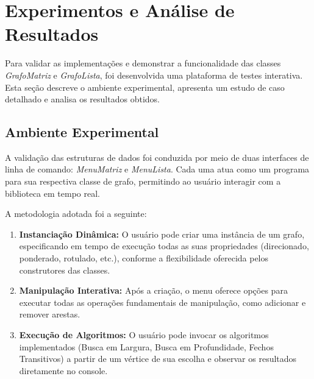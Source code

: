 \documentclass{sbc2023}%
\begin{document}


\section{Experimentos e Análise de Resultados}
\label{experimentos}

    Para validar as implementações e demonstrar a funcionalidade das classes \textit{GrafoMatriz} e \textit{GrafoLista}, foi desenvolvida uma plataforma de testes interativa. Esta seção descreve o ambiente experimental, apresenta um estudo de caso detalhado e analisa os resultados obtidos.
    
    \subsection{Ambiente Experimental}
    
        A validação das estruturas de dados foi conduzida por meio de duas interfaces de linha de comando: \textit{MenuMatriz} e \textit{MenuLista}. Cada uma atua como um programa para sua respectiva classe de grafo, permitindo ao usuário interagir com a biblioteca em tempo real.
        
        A metodologia adotada foi a seguinte:
        
        \begin{enumerate}
            \item \textbf{Instanciação Dinâmica:} O usuário pode criar uma instância de um grafo, especificando em tempo de execução todas as suas propriedades (direcionado, ponderado, rotulado, etc.), conforme a flexibilidade oferecida pelos construtores das classes.
            \item \textbf{Manipulação Interativa:} Após a criação, o menu oferece opções para executar todas as operações fundamentais de manipulação, como adicionar e remover arestas.
            \item \textbf{Execução de Algoritmos:} O usuário pode invocar os algoritmos implementados (Busca em Largura, Busca em Profundidade, Fechos Transitivos) a partir de um vértice de sua escolha e observar os resultados diretamente no console.
        \end{enumerate}
        
\end{document}

